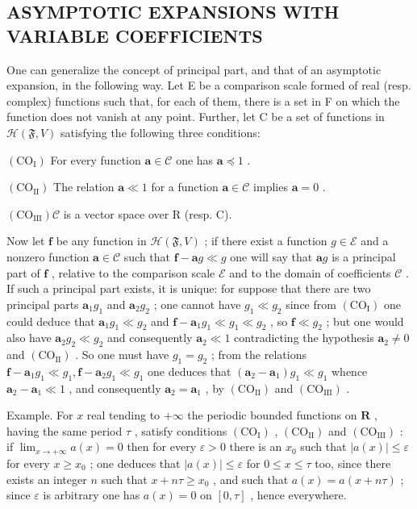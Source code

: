 \subsection{ASYMPTOTIC EXPANSIONS WITH VARIABLE COEFFICIENTS}

One can generalize the concept of principal part, and that of an asymptotic expansion, in the following way. Let E be a comparison scale formed of real (resp. complex) functions such that, for each of them, there is a set in F on which the function does not vanish at any point. Further, let C be a set of functions in \(\mathcal{H}(\mathfrak{F}, V)\) satisfying the following three conditions:

\((\mathrm{CO}_{\mathrm{I}})\) For every function \(\mathbf{a} \in \mathcal{C}\) one has \(\mathbf{a} \preccurlyeq 1\) .

\((\mathrm{CO}_{\mathrm{II}})\) The relation \(\mathbf{a} \ll 1\) for a function \(\mathbf{a} \in \mathcal{C}\) implies \(\mathbf{a} = 0\) .

\((\mathrm{CO}_{\mathrm{III}})\mathcal{C}\) is a vector space over R (resp. C).

Now let \(\mathbf{f}\) be any function in \(\mathcal{H}(\mathfrak{F}, V)\) ; if there exist a function \(g \in \mathcal{E}\) and a nonzero function \(\mathbf{a} \in \mathcal{C}\) such that \(\mathbf{f} - \mathbf{a}g \ll g\) one will say that \(\mathbf{a}g\) is a principal part of \(\mathbf{f}\) , relative to the comparison scale \(\mathcal{E}\) and to the domain of coefficients \(\mathcal{C}\) . If such a principal part exists, it is unique: for suppose that there are two principal parts \(\mathbf{a}_1g_1\) and \(\mathbf{a}_2g_2\) ; one cannot have \(g_1 \ll g_2\) since from \((\mathrm{CO_I})\) one could deduce that \(\mathbf{a}_1g_1 \ll g_2\) and \(\mathbf{f} - \mathbf{a}_1g_1 \ll g_1 \ll g_2\) , so \(\mathbf{f} \ll g_2\) ; but one would also have \(\mathbf{a}_2g_2 \ll g_2\) and consequently \(\mathbf{a}_2 \ll 1\) contradicting the hypothesis \(\mathbf{a}_2 \neq 0\) and \((\mathrm{CO_{II}})\) . So one must have \(g_1 = g_2\) ; from the relations \(\mathbf{f} - \mathbf{a}_1g_1 \ll g_1, \mathbf{f} - \mathbf{a}_2g_1 \ll g_1\) one deduces that \((\mathbf{a}_2 - \mathbf{a}_1)g_1 \ll g_1\) whence \(\mathbf{a}_2 - \mathbf{a}_1 \ll 1\) , and consequently \(\mathbf{a}_2 = \mathbf{a}_1\) , by \((\mathrm{CO_{II}})\) and \((\mathrm{CO_{III}})\) .

Example. For \(x\) real tending to \(+\infty\) the periodic bounded functions on \(\mathbf{R}\) , having the same period \(\tau\) , satisfy conditions \((\mathrm{CO}_{\mathrm{I}})\) , \((\mathrm{CO}_{\mathrm{II}})\) and \((\mathrm{CO}_{\mathrm{III}})\) : if \(\lim_{x\to +\infty}a(x) = 0\) then for every \(\varepsilon >0\) there is an \(x_0\) such that \(|a(x)|\leqslant \varepsilon\) for every \(x\geqslant x_0\) ; one deduces that \(|a(x)|\leqslant \varepsilon\) for \(0\leqslant x\leqslant \tau\) too, since there exists an integer \(n\) such that \(x + n\tau \geqslant x_0\) , and such that \(a(x) = a(x + n\tau)\) ; since \(\varepsilon\) is arbitrary one has \(a(x) = 0\) on \([0,\tau]\) , hence everywhere.

